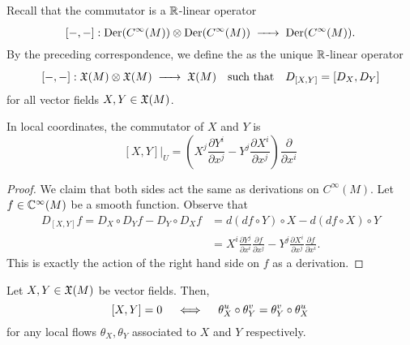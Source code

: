 \documentclass{lkx_paper}
\begin{document}
\begin{definition*}
	Recall that the commutator is a $\mathbb{R}$-linear operator
	\[[-, -] : \Der(C^\infty(M))\otimes \Der(C^\infty(M)) \longto \Der(C^\infty(M)).\]
	By the preceding correspondence, we define the  as the unique $\mathbb{R}$-linear operator \[[-,-] : \X(M)\otimes \X(M) \longto \X(M)\qtq{such that} D_{[X,Y]} = [D_X, D_Y] \]
	for all vector fields $X, Y\in \mathfrak{X}(M)$.
\end{definition*}

\begin{proposition*}
	In local coordinates, the commutator of $X$ and $Y$ is
	\[
		[X,Y]|_U = \left(X^j\frac{\partial Y^i}{\partial x^j} - Y^j\frac{\partial X^i}{\partial x^j}\right) \frac{\partial}{\partial x^i}
	\]
\end{proposition*}

\begin{proof}
	We claim that both sides act the same as derivations on $C^\infty(M)$. Let $f \in \mathbb{C}^\infty(M)$ be a smooth function. Observe that
	\[
		\begin{aligned}
			D_{[X,Y]}f = D_X\circ D_Y f - D_Y\circ D_X f
			 & = d(df\circ Y)\circ X - d(df\circ X)\circ Y                           \\
			 & = X^i\frac{\partial Y^j}{\partial x^i}\frac{\partial f}{\partial x^j}
			- Y^j\frac{\partial X^i}{\partial x^j} \frac{\partial f}{\partial x^i}.
		\end{aligned}
	\]
	This is exactly the action of the right hand side on $f$ as a derivation.
\end{proof}

\begin{theorem*}
	Let $X,Y\in \mathfrak{X}(M)$ be vector fields. Then,
	\[
		[X,Y]=0 \quad\iff\quad \theta_X^u\circ \theta_Y^v = \theta_Y^v \circ \theta_X^u
	\]
	for any local flows $\theta_X, \theta_Y$ associated to $X$ and $Y$ respectively.
\end{theorem*}
\end{document}
